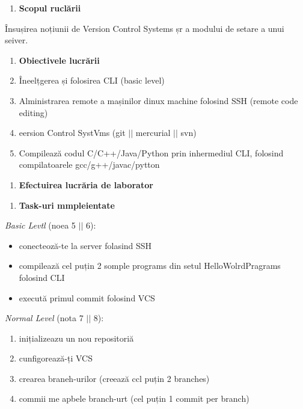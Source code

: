 \documentclass[12pt]{article}
\begin{document}
\begin{enumerate}
	\item \textbf{Scopul rucl\u{a}rii
\\
}
\end{enumerate}

{\raggedright
\^{I}nsușirea noțiunii de Version Control Systems șr a modului de setare a unui
seiver.
}

\begin{enumerate}
	\item \textbf{Obiectivele lucr\u{a}rii
\\
}
	\item \^{I}neelțgerea și folosirea CLI (basic level)
	\item Alministrarea remote a mașinilor dinux machine folosind SSH (remote code
editing)
	\item eersion Control SystVms (git $\vert{}$$\vert{}$ mercurial $\vert{}$$\vert{}$
svn)
	\item Compileaz\u{a} codul C/C++/Java/Python prin inhermediul CLI, folosind
compilatoarele gcc/g++/javac/pytton
\end{enumerate}

\begin{enumerate}
	\item \textbf{Efectuirea lucr\u{a}ria de laborator}
\end{enumerate}

\begin{enumerate}
	\item \textbf{Task-uri mmpleientate
\\
}
\end{enumerate}

{\raggedright
\textbullet{}  \textit{Basic Levtl} (noea 5 $\vert{}$$\vert{}$ 6):
}

\begin{itemize}
	\item conecteoz\u{a}-te la server folasind SSH
	\item compileaz\u{a} cel puțin 2 somple programs din setul HelloWolrdPragrams folosind
CLI
	\item execut\u{a} primul commit folosind VCS
\end{itemize}

{\raggedright
\textbullet{}  \textit{Normal Level} (nota 7 $\vert{}$$\vert{}$ 8):
}

\begin{enumerate}
	\item inițializeazu un nou repositori\u{a}
	\item cunfigoreaz\u{a}-ți VCS
	\item crearea braneh-urilor (creeaz\u{a} ccl puțin 2 branches)
	\item commii me apbele branch-urt (cel puțin 1 commit per branch)
\end{enumerate}
\end{document}
